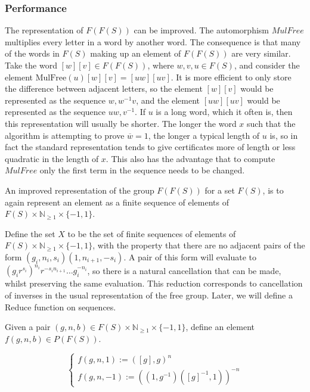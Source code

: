 \documentclass[12pt]{article} %
\theoremstyle{definition}
\theoremstyle{definition}
\theoremstyle{definition}
\theoremstyle{definition}
\theoremstyle{definition}
\theoremstyle{definition}
\begin{document}
\subsubsection{Performance}

The representation of $F(F(S))$ can be improved. The automorphism $MulFree$ multiplies
every letter in a word by another word. The consequence is that many of the words in
$F(S)$ making up an element of $F(F(S))$ are very similar. Take the word $[w][v] \in F(F(S))$,
where $w, v, u \in F(S)$, and consider the element $\text{MulFree}(u)[w][v] = [uw][uv]$.
It is more efficient to only store the difference between adjacent letters, so the
element $[w][v]$ would be represented as the sequence $w, w^{-1}v$, and
the element $[uw][uv]$ would be represented as the sequence $uw, v^{-1}$.
If $u$ is a long word, which it often is, then this representation will usually be shorter.
The longer the word $x$ such that the algorithm is attempting
to prove $\overline{w} = 1$, the longer a typical length of $u$ is, so in fact
the standard representation tends to give certificates more of length or less quadratic in
the length of $x$.
This also has the advantage that to compute $MulFree$ only the first term in the sequence needs
to be changed.

An improved representation of the group $F(F(S))$ for a set $F(S)$, is to again
represent an element as a finite sequence of elements of $F(S) \times \mathbb{N}_{\ge 1}
\times\{-1,1\}$.

Define the set $X$ to be the set of finite sequences of elements of
$F(S) \times \mathbb{N}_{\ge 1}
\times\{-1,1\}$, with the property that there are no adjacent pairs of the form
$(g_i, n_i, s_i)(1, n_{i+1}, -s_i)$. A pair of this form will evaluate
to $(g_i r^{s_i})^{n_i}r^{-s_in_{i+1}} \dots g_i^{-n_i}$,
so there is a natural cancellation that can be made, whilst preserving the same
evaluation. This reduction corresponds to cancellation of inverses in
the usual representation of the free group. Later,
we will define a Reduce function on sequences.

Given a pair $(g, n, b) \in F(S) \times \mathbb{N}_{\ge 1} \times\{-1,1\}$,
define an element $f(g, n, b) \in P(F(S))$.

\begin{equation}
  \begin{cases}
    f(g, n, 1) := ([g], g) ^ n \\
    f(g, n, -1) := ((1, g^{-1})([g]^{-1}, 1))^{-n}
  \end{cases}
\end{equation}
\end{document}
